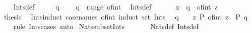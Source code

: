 \begin{isabellebody}
%
\isadelimproof
\ \ %
\endisadelimproof
%
\isatagproof
{}\isamarkupfalse%
\ Ints{\isacharunderscore}{\kern0pt}def\isanewline
{}\isamarkupfalse%
\ {\isacharminus}{\kern0pt}\isanewline
\ \ \isamarkupfalse%
\ {\isacartoucheopen}q\ {\isasymin}\ {\isasymint}{\isacartoucheclose}\ \isamarkupfalse%
\ {\isachardoublequoteopen}q\ {\isasymin}\ range\ of{\isacharunderscore}{\kern0pt}int{\isachardoublequoteclose}\ \isamarkupfalse%
\ Ints{\isacharunderscore}{\kern0pt}def\ \isacommand{{\isachardot}{\kern0pt}}\isamarkupfalse%
\isanewline
\ \ \isamarkupfalse%
\ \isamarkupfalse%
\ z\ \ {\isachardoublequoteopen}q\ {\isacharequal}{\kern0pt}\ of{\isacharunderscore}{\kern0pt}int\ z{\isachardoublequoteclose}\ \isacommand{{\isachardot}{\kern0pt}{\isachardot}{\kern0pt}}\isamarkupfalse%
\isanewline
\ \ \isamarkupfalse%
\ \isamarkupfalse%
\ thesis\ \isacommand{{\isachardot}{\kern0pt}{\isachardot}{\kern0pt}}\isamarkupfalse%
\isanewline
{}\isamarkupfalse%
%
\endisatagproof
{\isafoldproof}%
%
\isadelimproof
\isanewline
%
\endisadelimproof
\isanewline
{}\isamarkupfalse%
\ Ints{\isacharunderscore}{\kern0pt}induct\ {\isacharbrackleft}{\kern0pt}case{\isacharunderscore}{\kern0pt}names\ of{\isacharunderscore}{\kern0pt}int{\isacharcomma}{\kern0pt}\ induct\ set{\isacharcolon}{\kern0pt}\ Ints{\isacharbrackright}{\kern0pt}{\isacharcolon}{\kern0pt}\isanewline
\ \ {\isachardoublequoteopen}q\ {\isasymin}\ {\isasymint}\ {\isasymLongrightarrow}\ {\isacharparenleft}{\kern0pt}{\isasymAnd}z{\isachardot}{\kern0pt}\ P\ {\isacharparenleft}{\kern0pt}of{\isacharunderscore}{\kern0pt}int\ z{\isacharparenright}{\kern0pt}{\isacharparenright}{\kern0pt}\ {\isasymLongrightarrow}\ P\ q{\isachardoublequoteclose}\isanewline
%
\isadelimproof
\ \ %
\endisadelimproof
%
\isatagproof
{}\isamarkupfalse%
\ {\isacharparenleft}{\kern0pt}rule\ Ints{\isacharunderscore}{\kern0pt}cases{\isacharparenright}{\kern0pt}\ auto%
\endisatagproof
{\isafoldproof}%
%
\isadelimproof
\isanewline
%
\endisadelimproof
\isanewline
{}\isamarkupfalse%
\ Nats{\isacharunderscore}{\kern0pt}subset{\isacharunderscore}{\kern0pt}Ints{\isacharcolon}{\kern0pt}\ {\isachardoublequoteopen}{\isasymnat}\ {\isasymsubseteq}\ {\isasymint}{\isachardoublequoteclose}\isanewline
%
\isadelimproof
\ \ %
\endisadelimproof
%
\isatagproof
{}\isamarkupfalse%
\ Nats{\isacharunderscore}{\kern0pt}def\ Ints{\isacharunderscore}{\kern0pt}def\isanewline

\end{isabellebody}
